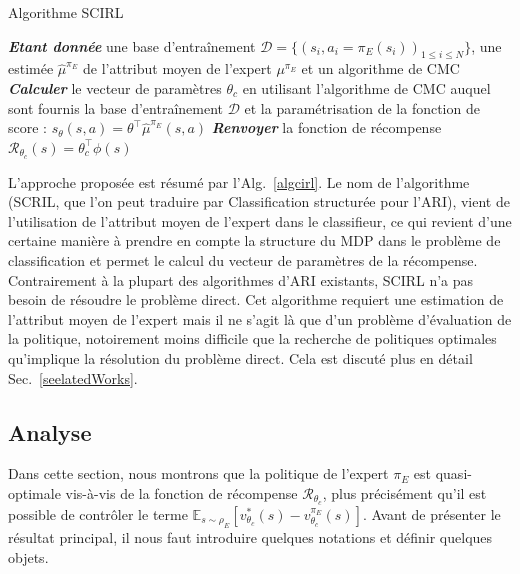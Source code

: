 \documentclass[french,utf8]{./hermes-journal}
\newcommand{\R}{\mathcal{R}}
\newcommand{\D}{\mathcal{D}}
\newcommand{\E}{\mathbb{E}}
\begin{document}
\begin{algorithm2e}%
  \SetAlgoVlined
  \caption{Algorithme SCIRL}
  \label{algcirl}
  \BlankLine
  \emph{\textbf{Etant donnée}} une base d'entraînement $\D = \{(s_i,a_i=\pi_E(s_i))_{1\leq i\leq N}\}$,
  une estimée $\hat{\mu}^{\pi_E}$ de l'attribut moyen de l'expert $\mu^{\pi_E}$ et un algorithme de CMC\;
  \BlankLine
  \emph{\textbf{Calculer}} le vecteur de paramètres $\theta_c$ en utilisant l'algorithme de CMC auquel sont fournis la base d'entraînement $\D$ et la paramétrisation de la fonction de score : $s_\theta(s,a) = \theta^\top\hat{\mu}^{\pi_E}(s,a)$\;
  \BlankLine
  \emph{\textbf{Renvoyer}} la fonction de récompense $\R_{\theta_c}(s) = \theta_c^\top\phi(s)$ \;
\end{algorithm2e}

L'approche proposée est résumé par l'Alg.~\ref{algcirl}. Le nom de l'algorithme (SCRIL, que l'on peut traduire par Classification structurée pour l'ARI), vient de l'utilisation de l'attribut moyen de l'expert dans le classifieur, ce qui revient d'une certaine manière à prendre en compte la structure du MDP dans le problème de classification et permet le calcul du vecteur de paramètres de la récompense. Contrairement à la plupart des algorithmes d'ARI existants, SCIRL n'a pas besoin de résoudre le problème direct. Cet algorithme requiert une estimation de l'attribut moyen de l'expert mais il ne s'agit là que d'un problème d'évaluation de la politique, notoirement moins difficile que la recherche de politiques optimales qu'implique la résolution du problème direct. Cela est discuté plus en détail Sec.~\ref{seelatedWorks}.
%


\subsection{Analyse}
\label{subsecirnalysis}

Dans cette section, nous montrons que la politique de l'expert $\pi_E$ est quasi-optimale vis-à-vis de la fonction de récompense $\R_{\theta_c}$, plus précisément qu'il est possible de contrôler le terme
$\E_{s\sim\rho_E}[v^*_{\theta_c}(s)-v^{\pi_E}_{\theta_c}(s)]$.
Avant de présenter le résultat principal, il nous faut introduire quelques notations et définir quelques objets.
\end{document}

